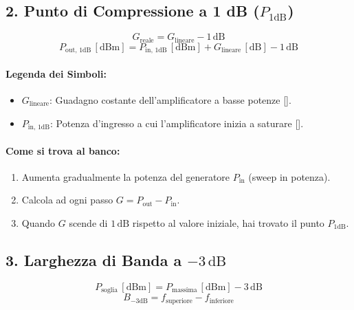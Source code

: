 \documentclass[openany,a4paper,12pt]{book}
\begin{document}
\subsection{2. Punto di Compressione a 1 dB ($P_{1\text{dB}}$)}

\begin{tcolorbox}[title=Condizione di Compressione]
\[
G_{\text{reale}} = G_{\text{lineare}} - 1\,\text{dB}
\]
\[
P_{\text{out, 1dB}} \, [\text{dBm}] = P_{\text{in, 1dB}} \, [\text{dBm}] + G_{\text{lineare}} \, [\text{dB}] - 1\,\text{dB}
\]
\end{tcolorbox}

\paragraph{Legenda dei Simboli:}
\begin{itemize}
    \item $G_{\text{lineare}}$: Guadagno costante dell'amplificatore a basse potenze [].
    \item $P_{\text{in, 1dB}}$: Potenza d'ingresso a cui l'amplificatore inizia a saturare [].
\end{itemize}

\paragraph{Come si trova al banco:}
\begin{enumerate}
    \item Aumenta gradualmente la potenza del generatore $P_{\text{in}}$ (sweep in potenza).
    \item Calcola ad ogni passo $G = P_{\text{out}} - P_{\text{in}}$.
    \item Quando $G$ scende di $1\,\text{dB}$ rispetto al valore iniziale, hai trovato il punto $P_{1\text{dB}}$.
\end{enumerate}

\subsection{3. Larghezza di Banda a $-3\,\text{dB}$}

\begin{tcolorbox}[title=Formula della Banda Passante]
\[
P_{\text{soglia}} \, [\text{dBm}] = P_{\text{massima}} \, [\text{dBm}] - 3\,\text{dB}
\]
\[
B_{-3\text{dB}} = f_{\text{superiore}} - f_{\text{inferiore}}
\]
\end{tcolorbox}
\end{document}
